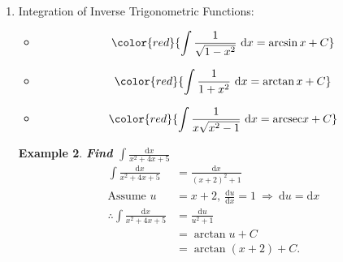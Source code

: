 \documentclass[12pt, a4paper]{article}
\newtheorem{example}{Example}[subsection]
\begin{document}
\begin{enumerate}
\begin{example}
        $$\begin{aligned}
            \therefore\int 2x(x^2+3)^5\ \mathrm{d}x&=\int (x^2+3)^5\cdot (2x\cdot\mathrm{d}x)\\
            &=\int u^5\ \mathrm{d}u\\
            &=\frac{1}{6}u^6+C\\
            &=\frac{1}{6}(x^2+3)^6+C.
        \end{aligned}$$
    \end{example}
    \item Integration of Inverse Trigonometric Functions: 
    \begin{itemize}
        \item $${\color{red}{\int \frac{1}{\sqrt{1-x^2}}\ \mathrm{d}x=\arcsin x+C}}$$
        \item $${\color{red}{\int \frac{1}{1+x^2}\ \mathrm{d}x=\arctan x+C}}$$
        \item $${\color{red}{\int \frac{1}{x\sqrt{x^2-1}}\ \mathrm{d}x=\text{arcsec} x+C}}$$
    \end{itemize}
    \begin{example}
        \textbf{Find $\int \frac{\mathrm{d}x}{x^2+4x+5}$}
        $$\begin{aligned}
            \int \frac{\mathrm{d}x}{x^2+4x+5}&=\frac{\mathrm{d}x}{(x+2)^2+1}\\
            \text{Assume }u&=x+2,\ \frac{\mathrm{d}u}{\mathrm{d}x}=1\ \Rightarrow\ \mathrm{d}u=\mathrm{d}x\\
            \therefore  \int \frac{\mathrm{d}x}{x^2+4x+5}&=\frac{\mathrm{d}u}{u^2+1}\\
            &=\arctan u+C\\
            &=\arctan (x+2)+C.
        \end{aligned}$$
    \end{example}
\end{enumerate}
\end{document}
